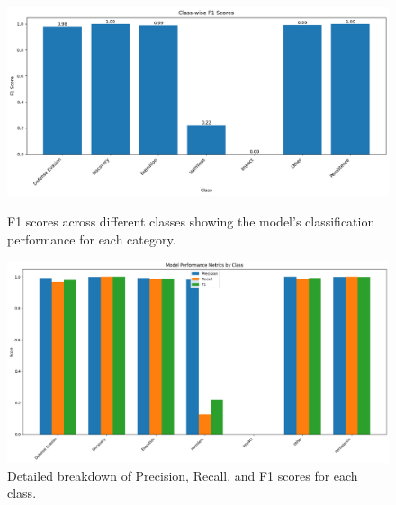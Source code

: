         \begin{figure}[h]
            \centering
            \begin{minipage}[c]{0.47\textwidth}
                \centering
                \vspace{0.1cm}
                \includegraphics[width=\textwidth]{../figures/plots/section4/f1_scores.png}
                \caption{F1 scores across different classes showing the model's classification performance for each category.}
                \label{fig:f1_scores}
            \end{minipage}
            \hfill
            \begin{minipage}[c]{0.47\textwidth}
                \centering
                \includegraphics[width=\textwidth]{../figures/plots/section4/performance_metrics.png}
                \caption{Detailed breakdown of Precision, Recall, and F1 scores for each class.}
                \label{fig:performance_metrics}
            \end{minipage}
        \end{figure}
        
